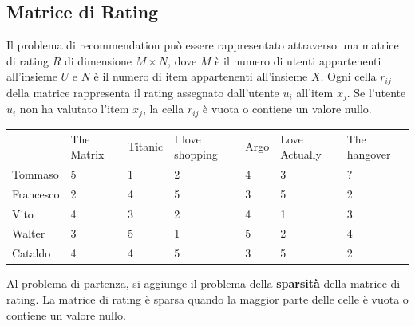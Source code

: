 \documentclass{report}
\begin{document}
	\subsection{Matrice di Rating}
	Il problema di recommendation può essere rappresentato attraverso una matrice di rating $R$ di dimensione $M \times N$, dove $M$ è il numero di utenti appartenenti all'insieme $U$ e $N$ è il numero di item appartenenti all'insieme $X$. Ogni cella $r_{ij}$ della matrice rappresenta il rating assegnato dall'utente $u_i$ all'item $x_j$. Se l'utente $u_i$ non ha valutato l'item $x_j$, la cella $r_{ij}$ è vuota o contiene un valore nullo.
	\begin{table}[H]
		\begin{tabular}{lllllll}
		 &
		  The Matrix &
		  Titanic &
		  I love shopping &
		  Argo &
		  Love Actually &
		  The hangover \\ \cline{2-7} 
		\multicolumn{1}{l|}{Tommaso} &
		  \multicolumn{1}{l|}{5} &
		  \multicolumn{1}{l|}{1} &
		  \multicolumn{1}{l|}{2} &
		  \multicolumn{1}{l|}{4} &
		  \multicolumn{1}{l|}{3} &
		  \multicolumn{1}{l|}{\color{red}?} \\ \cline{2-7} 
		\multicolumn{1}{l|}{Francesco} &
		  \multicolumn{1}{l|}{2} &
		  \multicolumn{1}{l|}{4} &
		  \multicolumn{1}{l|}{5} &
		  \multicolumn{1}{l|}{3} &
		  \multicolumn{1}{l|}{5} &
		  \multicolumn{1}{l|}{2} \\ \cline{2-7} 
		\multicolumn{1}{l|}{Vito} &
		  \multicolumn{1}{l|}{4} &
		  \multicolumn{1}{l|}{3} &
		  \multicolumn{1}{l|}{2} &
		  \multicolumn{1}{l|}{4} &
		  \multicolumn{1}{l|}{1} &
		  \multicolumn{1}{l|}{3} \\ \cline{2-7} 
		\multicolumn{1}{l|}{Walter} &
		  \multicolumn{1}{l|}{3} &
		  \multicolumn{1}{l|}{5} &
		  \multicolumn{1}{l|}{1} &
		  \multicolumn{1}{l|}{5} &
		  \multicolumn{1}{l|}{2} &
		  \multicolumn{1}{l|}{4} \\ \cline{2-7} 
		\multicolumn{1}{l|}{Cataldo} &
		  \multicolumn{1}{l|}{4} &
		  \multicolumn{1}{l|}{4} &
		  \multicolumn{1}{l|}{5} &
		  \multicolumn{1}{l|}{3} &
		  \multicolumn{1}{l|}{5} &
		  \multicolumn{1}{l|}{2} \\ \cline{2-7} 
		\end{tabular}
	\end{table}
	Al problema di partenza, si aggiunge il problema della \textbf{sparsità} della matrice di rating. La matrice di rating è sparsa quando la maggior parte delle celle è vuota o contiene un valore nullo. 
\end{document}
